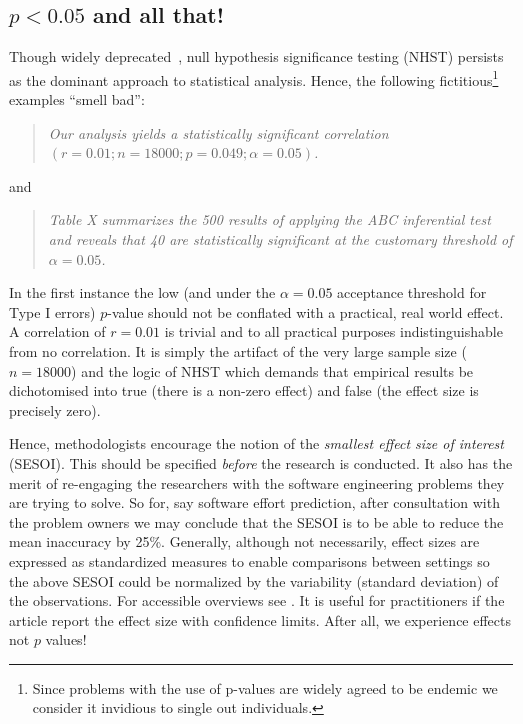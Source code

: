 \documentclass[preprint,10pt]{elsarticle}
\begin{document}
\subsection{$p<0.05$ and all that!}

Though widely deprecated~\cite{carver93,Simm11,Colq14},
 null hypothesis significance testing (NHST) persists as the dominant approach to statistical analysis. Hence, the following fictitious\footnote{Since problems with the use of p-values are widely agreed to be endemic \cite{Simm11,Jorg16} we consider it invidious to single out individuals.} examples ``smell bad'':
\begin{quote}
    {\em Our analysis yields a statistically significant correlation $(r = 0.01;n = 18000;p = 0.049;\alpha = 0.05)$.}
\end{quote}

\noindent
and

\begin{quote}
    {\em Table X summarizes the 500 results of applying the ABC inferential test and reveals that 40 are statistically significant at the customary threshold of $\alpha=0.05$.}
\end{quote}

\noindent
In the first instance the low (and under the $\alpha=0.05$ acceptance threshold for Type I errors)  $p$-value should not be conflated with a practical, real world effect.   A correlation of $r=0.01$ is trivial and to all practical purposes indistinguishable from no correlation.  It is simply the artifact of the very large sample size ($n=18000$) and the logic of NHST which demands that empirical results be dichotomised into true (there is a non-zero effect) and false (the effect size is precisely zero).  

Hence, methodologists encourage the notion of the {\em smallest effect size of interest} (SESOI).  This should be specified \textit{before} the research is conducted.  It also has the merit of re-engaging the researchers with the software engineering problems they are trying to solve.  So for, say software effort prediction, after consultation with the problem owners we may conclude that the SESOI is to be able to reduce the mean inaccuracy by 25\%. Generally, although not necessarily, effect sizes are expressed as standardized measures to enable comparisons between settings so the above SESOI could be normalized by the variability (standard deviation) of the observations. For accessible overviews see \cite{Elli10,Cohe92}.  It is useful for practitioners if the article report the effect size with confidence limits.  After all, we experience effects not $p$ values!
 
\end{document}
